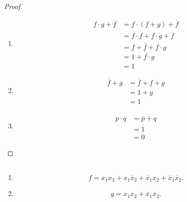 \documentclass[UTF8]{ctexart}
\begin{document}
\subsection{}   %
\begin{proof}
    \begin{enumerate}
        \item [(1)]
        \begin{align*}
            f\cdot g + \overline{f}
            & =
            f\cdot (f+g) + \overline{f}\\
            & =
            f\cdot f + f\cdot g + \overline{f}\\
            & =
            f + \overline{f} + f\cdot g\\
            & =
            1 + f\cdot g\\
            & =
            1
        \end{align*}
        \item [(2)]
        \begin{align*}
            \overline{f} + g
            & =
            \overline{f} + f + g\\
            & =
            1 + g\\
            & =
            1
        \end{align*}
        \item [(3)]
        \begin{align*}
            p \cdot \overline{q}
            & =
            \overline{\overline{p} + q}\\
            & =
            \overline{1}\\
            & =
            0
        \end{align*}
    \end{enumerate}    
\end{proof}

\subsection{}   %
\begin{enumerate}
    \item [(1)]
    \[
        f= x_1 x_2 + x_1 \overline{x}_2 + \overline{x}_1 x_2 + \overline{x}_1 \overline{x}_2 .  
    \]
    \item [(2)]
    \[
        g= x_1 x_2 + \overline{x}_1 \overline{x}_2 .
    \]
\end{enumerate}
\end{document}

